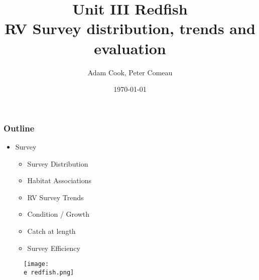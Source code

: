 \documentclass{beamer}
\title[Unit III Redfish]{Unit III Redfish\\ RV Survey distribution, trends and evaluation }
\author{Adam Cook, Peter Comeau} %
\institute[Population Ecology Division] 
{
Bedford Institute of Oceanography \\ %
\medskip
\textit{Adam.Cook@dfo-mpo.gc.ca} %
}
\date{\today} %
\begin{document}
\begin{frame}
\titlepage %
\end{frame}
\newcommand{\D}{.}
\newcommand{\e}{/home/ecomod_data/redfish/figures/}



\begin{frame}
\frametitle{Outline}
\begin{block}

\begin{itemize}


\item Survey
	\begin{itemize}
		\item Survey Distribution
		\item Habitat Associations
		\item RV Survey Trends		
		\item Condition / Growth
		\item Catch at length
		\item Survey Efficiency
	\end{itemize}

				\end{itemize}
				\end{block}
				\begin{figure}
				\vspace*{-.75cm}
				 \hspace*{5cm} \centerline{\texttt{[image: \\e redfish.png]}} 
				 \vspace*{-1.5cm}
				 \end{figure}

\end{frame}


\end{document}
